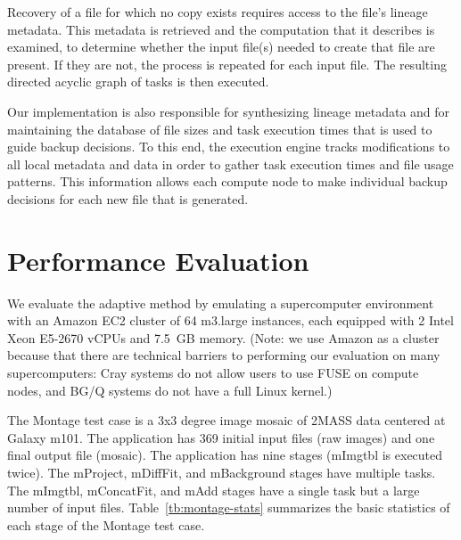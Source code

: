 \documentclass{sig-alternate}
\newcommand{\katznote}[1]{ {\textcolor{blue}    { ***Dan:      #1 }}}
\newcommand{\zhaonote}[1]{{\textcolor{cyan}    { ***Zhao:      #1 }}}
\newcommand{\katznote}[1]{}
\newcommand{\zhaonote}[1]{}
\begin{document}
Recovery of a file for which no copy exists requires access to the file's lineage metadata.
This metadata is retrieved and the computation that it describes is examined, to
determine whether the input file(s) needed to create that file are present. If they are not, the process is repeated for each input file.
The resulting directed acyclic graph of tasks is then executed.

Our implementation is also responsible for synthesizing lineage metadata and for
maintaining the database of file sizes and task execution times that is
used to guide backup decisions. To this end, the execution engine tracks modifications to all
local metadata and data
in order to gather task execution times and file usage patterns.
This information allows each compute node to make individual backup decisions for each new
file that is generated.



\section{Performance Evaluation}
\label{sec:Perf}
We evaluate the adaptive method by emulating a supercomputer environment with an Amazon EC2 cluster of 64 m3.large instances, each equipped with 2 Intel Xeon E5-2670 vCPUs and 7.5~GB memory.  (Note: we use Amazon as a cluster because that there are technical barriers to performing our evaluation on many supercomputers: Cray systems do not allow users to use FUSE on compute nodes, and BG/Q systems do not have a full Linux kernel.)

The Montage test case is a 3x3 degree image mosaic of 2MASS data centered at Galaxy m101. 
The application has 369 initial input files (raw images) and one final output file (mosaic). 
The application has nine stages (mImgtbl is executed twice). 
The mProject, mDiffFit, and mBackground stages have multiple tasks. 
The mImgtbl, mConcatFit, and mAdd stages have a single task but a large number of input files. 
Table~\ref{tb:montage-stats} summarizes the basic statistics of each stage of the Montage test case.
\end{document}

